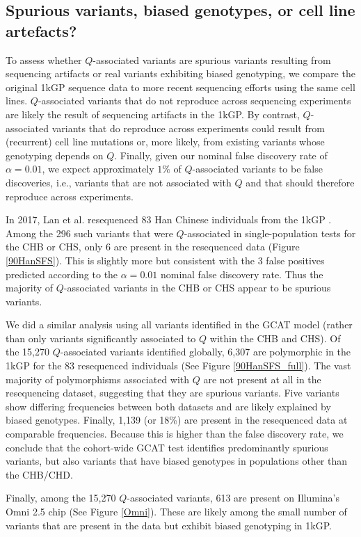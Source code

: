 \documentclass[9pt,article]{template}
\begin{document}
\subsection{Spurious variants, biased genotypes, or cell line artefacts?}
To assess whether $Q$-associated variants are spurious variants resulting from sequencing artifacts or real variants exhibiting biased genotyping, we compare the original 1kGP sequence data to more recent sequencing efforts using the same cell lines.
$Q$-associated variants that do not reproduce across sequencing experiments are likely the result of sequencing artifacts in the 1kGP. By contrast, 
$Q$-associated variants that do reproduce across experiments could result from (recurrent) cell line mutations or, more likely, from existing variants whose genotyping depends on $Q$. Finally, given our nominal false discovery rate of $\alpha = 0.01$, we expect approximately $1\%$ of $Q$-associated variants to be false discoveries, i.e., variants that are not associated with $Q$ and that should therefore reproduce across experiments. 


In 2017, Lan et al. resequenced 83 Han Chinese individuals from the 1kGP \citep{Lan2017}. 
Among the 296 such variants that were $Q$-associated in single-population tests for the CHB or CHS, only 6 are present in the resequenced data (Figure \ref{90HanSFS}).   
This is slightly more but consistent with the 3 false positives predicted according to the $\alpha = 0.01$ nominal false discovery rate. 
Thus the majority of $Q$-associated variants in the CHB or CHS  appear to be spurious variants. 

We did a similar analysis using all variants identified in the GCAT model (rather than only variants significantly associated to $Q$ within the CHB and CHS). 
Of the 15,270 $Q$-associated variants identified globally, 6,307 are polymorphic in the 1kGP for the 83 resequenced individuals  (See Figure \ref{90HanSFS_full}).
The vast majority of polymorphisms associated with $Q$ are not present at all in the resequencing dataset, suggesting that they are spurious variants.
Five variants show differing frequencies between both datasets and are likely explained by biased genotypes.
Finally, 1,139 (or 18\%) are present in the resequenced data at comparable frequencies.
Because this is higher than the false discovery rate, we conclude that the cohort-wide GCAT test identifies predominantly spurious variants, but also variants that have biased genotypes in populations other than the CHB/CHD. 

Finally, among the 15,270 $Q$-associated variants, 613 are present on Illumina's Omni 2.5 chip (See Figure \ref{Omni}). 
These are likely among the small number of variants that are present in the data but exhibit biased genotyping in 1kGP. 
\end{document}
